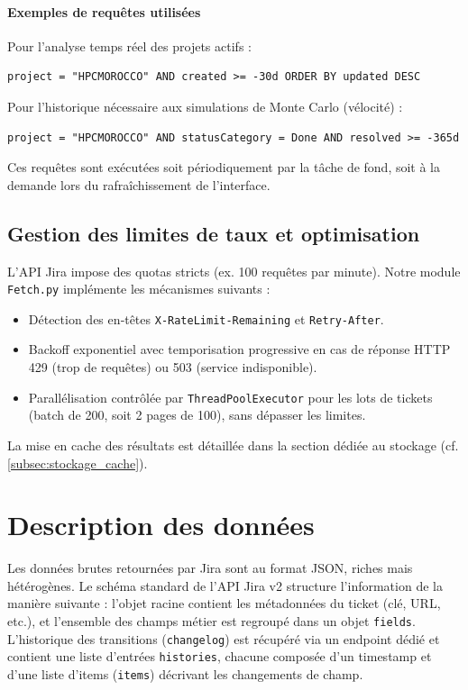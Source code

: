 \paragraph{Exemples de requêtes utilisées}
Pour l’analyse temps réel des projets actifs :
\begin{verbatim}
project = "HPCMOROCCO" AND created >= -30d ORDER BY updated DESC
\end{verbatim}
Pour l’historique nécessaire aux simulations de Monte Carlo (vélocité) :
\begin{verbatim}
project = "HPCMOROCCO" AND statusCategory = Done AND resolved >= -365d
\end{verbatim}

Ces requêtes sont exécutées soit périodiquement par la tâche de fond, soit à la demande lors du rafraîchissement de l’interface.

\subsection{Gestion des limites de taux et optimisation}
L’API Jira impose des quotas stricts (ex. 100 requêtes par minute). Notre module \texttt{Fetch.py} implémente les mécanismes suivants :
\begin{itemize}
    \renewcommand{\labelitemi}{—}
    \item Détection des en‑têtes \texttt{X-RateLimit-Remaining} et \texttt{Retry-After}.
    \item Backoff exponentiel avec temporisation progressive en cas de réponse HTTP 429 (trop de requêtes) ou 503 (service indisponible).
    \item Parallélisation contrôlée par \texttt{ThreadPoolExecutor} pour les lots de tickets (batch de 200, soit 2 pages de 100), sans dépasser les limites.
\end{itemize}
La mise en cache des résultats est détaillée dans la section dédiée au stockage (cf. \ref{subsec:stockage_cache}).

\section{Description des données}
Les données brutes retournées par Jira sont au format JSON, riches mais hétérogènes. Le schéma standard de l’API Jira v2 structure l’information de la manière suivante : l’objet racine contient les métadonnées du ticket (clé, URL, etc.), et l’ensemble des champs métier est regroupé dans un objet \texttt{fields}. L’historique des transitions (\texttt{changelog}) est récupéré via un endpoint dédié et contient une liste d’entrées \texttt{histories}, chacune composée d’un timestamp et d’une liste d’items (\texttt{items}) décrivant les changements de champ.






